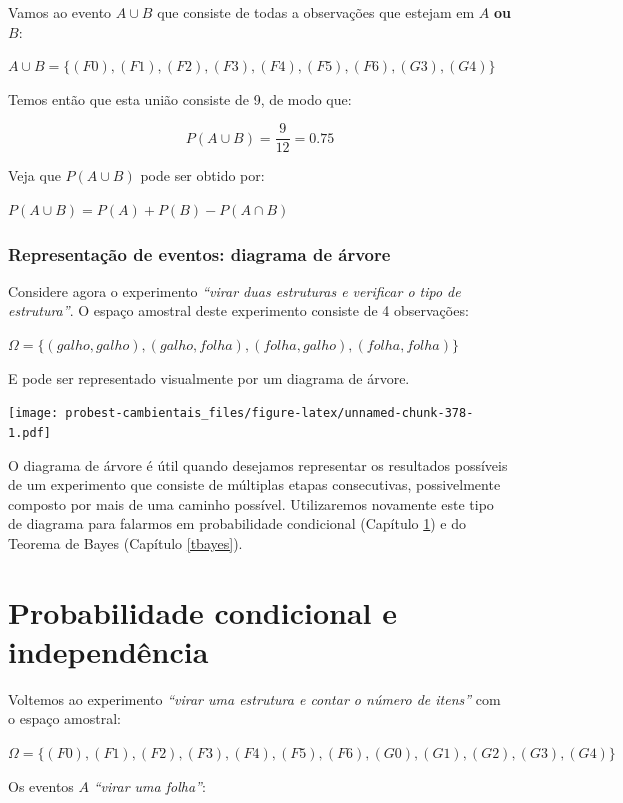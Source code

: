 \documentclass[
]{book}
\begin{document}
Vamos ao evento \(A \cup B\) que consiste de todas a observações que estejam em \(A\) \textbf{ou} \(B\):

\(A \cup B = \{(F0),(F1),(F2),(F3),(F4),(F5),(F6),(G3),(G4) \}\)

Temos então que esta união consiste de 9, de modo que:

\[P(A \cup B) = \frac{9}{12} = 0.75\]

Veja que \(P(A \cup B)\) pode ser obtido por:

\(P(A \cup B) = P(A) + P(B) - P(A \cap B)\)

\hypertarget{representauxe7uxe3o-de-eventos-diagrama-de-uxe1rvore}{%
\subsection{Representação de eventos: diagrama de árvore}\label{representauxe7uxe3o-de-eventos-diagrama-de-uxe1rvore}}

Considere agora o experimento \emph{``virar duas estruturas e verificar o tipo de estrutura''}. O espaço amostral deste experimento consiste de 4 observações:

\(\Omega = \{(galho, galho), (galho, folha), (folha, galho), (folha, folha)\}\)

E pode ser representado visualmente por um diagrama de árvore.

\texttt{[image: probest-cambientais\_files/figure-latex/unnamed-chunk-378-1.pdf]}

O diagrama de árvore é útil quando desejamos representar os resultados possíveis de um experimento que consiste de múltiplas etapas consecutivas, possivelmente composto por mais de uma caminho possível. Utilizaremos novamente este tipo de diagrama para falarmos em probabilidade condicional (Capítulo \ref{probcondind}) e do Teorema de Bayes (Capítulo \ref{tbayes}).

\hypertarget{probcondind}{%
\chapter{Probabilidade condicional e independência}\label{probcondind}}

Voltemos ao experimento \emph{``virar uma estrutura e contar o número de itens''} com o espaço amostral:

\(\Omega = \{(F0), (F1), (F2), (F3), (F4), (F5), (F6), (G0), (G1), (G2), (G3), (G4)\}\)

Os eventos \(A\) \emph{``virar uma folha''}:
\end{document}
